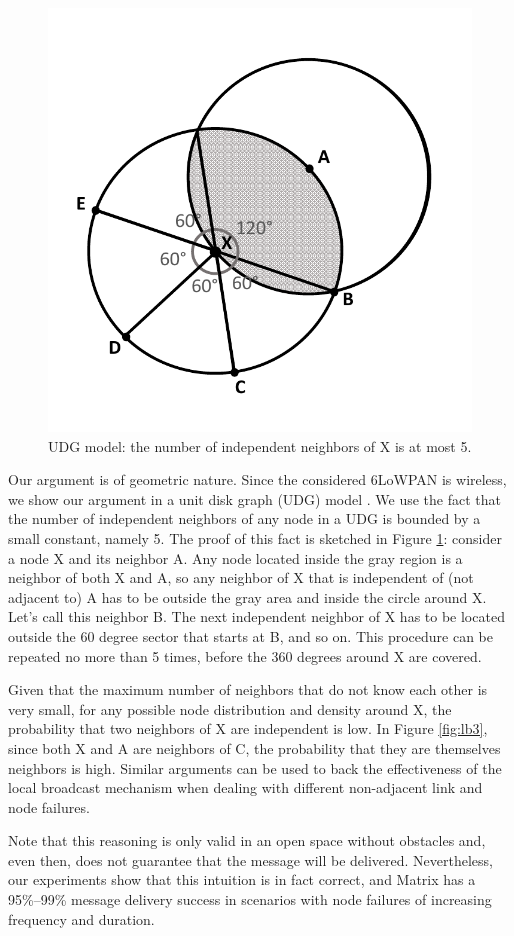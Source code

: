 \begin{figure}[!ht]
    \centering
    \includegraphics[width=.6\linewidth]{./Images/localbroad.pdf}
\caption{UDG model: the number of independent neighbors of X is at most 5.}
    \label{fig:udgIndN}
\end{figure}

Our argument is of geometric nature. Since the considered 6LoWPAN is
wireless, we show our argument in a unit disk graph (UDG) model
\cite{Clark:1991}. We use the fact that the number of independent neighbors of
any node in a UDG is bounded by a small constant, namely 5. The proof of this
fact is sketched in Figure \ref{fig:udgIndN}: consider a node X and its neighbor
A. Any node located inside the gray region is a neighbor of both X and A, so any
neighbor of X that is independent of (not adjacent to) A has to be outside the
gray area and inside the circle around X. Let's call this neighbor B. The next
independent neighbor of X has to be located outside the 60 degree sector that
starts at B, and so on. This procedure can be repeated no more than 5 times,
before the 360 degrees around X are covered.

Given that the maximum number of neighbors that do not know each
other is very small, for any possible node distribution and density
around X, the probability that two neighbors of X are independent is
low. In Figure \ref{fig:lb3}, since both X and A are neighbors of C,
the probability that they are themselves neighbors is high. Similar
arguments can be used to back the effectiveness of the local
broadcast mechanism when dealing with different non-adjacent link
and node failures.

Note that this reasoning is only valid in an open space without obstacles and,
even then, does not guarantee that the message will be delivered. Nevertheless,
our experiments show that this intuition is in fact correct, and Matrix has a
95\%--99\% message delivery success in scenarios with node failures of
increasing frequency and duration.
